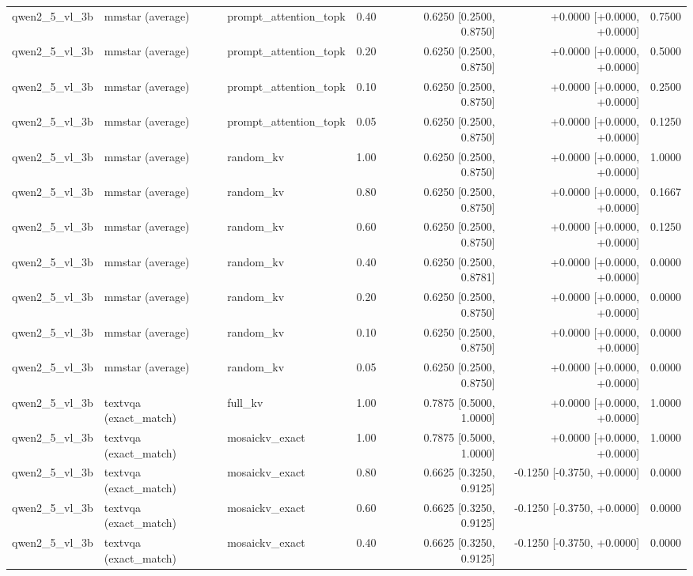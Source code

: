 \begin{longtable}{lllrrrr}
qwen2\_5\_vl\_3b & mmstar (average) & prompt\_attention\_topk & 0.40 & 0.6250 [0.2500, 0.8750] & +0.0000 [+0.0000, +0.0000] & 0.7500 \\
qwen2\_5\_vl\_3b & mmstar (average) & prompt\_attention\_topk & 0.20 & 0.6250 [0.2500, 0.8750] & +0.0000 [+0.0000, +0.0000] & 0.5000 \\
qwen2\_5\_vl\_3b & mmstar (average) & prompt\_attention\_topk & 0.10 & 0.6250 [0.2500, 0.8750] & +0.0000 [+0.0000, +0.0000] & 0.2500 \\
qwen2\_5\_vl\_3b & mmstar (average) & prompt\_attention\_topk & 0.05 & 0.6250 [0.2500, 0.8750] & +0.0000 [+0.0000, +0.0000] & 0.1250 \\
qwen2\_5\_vl\_3b & mmstar (average) & random\_kv & 1.00 & 0.6250 [0.2500, 0.8750] & +0.0000 [+0.0000, +0.0000] & 1.0000 \\
qwen2\_5\_vl\_3b & mmstar (average) & random\_kv & 0.80 & 0.6250 [0.2500, 0.8750] & +0.0000 [+0.0000, +0.0000] & 0.1667 \\
qwen2\_5\_vl\_3b & mmstar (average) & random\_kv & 0.60 & 0.6250 [0.2500, 0.8750] & +0.0000 [+0.0000, +0.0000] & 0.1250 \\
qwen2\_5\_vl\_3b & mmstar (average) & random\_kv & 0.40 & 0.6250 [0.2500, 0.8781] & +0.0000 [+0.0000, +0.0000] & 0.0000 \\
qwen2\_5\_vl\_3b & mmstar (average) & random\_kv & 0.20 & 0.6250 [0.2500, 0.8750] & +0.0000 [+0.0000, +0.0000] & 0.0000 \\
qwen2\_5\_vl\_3b & mmstar (average) & random\_kv & 0.10 & 0.6250 [0.2500, 0.8750] & +0.0000 [+0.0000, +0.0000] & 0.0000 \\
qwen2\_5\_vl\_3b & mmstar (average) & random\_kv & 0.05 & 0.6250 [0.2500, 0.8750] & +0.0000 [+0.0000, +0.0000] & 0.0000 \\
qwen2\_5\_vl\_3b & textvqa (exact\_match) & full\_kv & 1.00 & 0.7875 [0.5000, 1.0000] & +0.0000 [+0.0000, +0.0000] & 1.0000 \\
qwen2\_5\_vl\_3b & textvqa (exact\_match) & mosaickv\_exact & 1.00 & 0.7875 [0.5000, 1.0000] & +0.0000 [+0.0000, +0.0000] & 1.0000 \\
qwen2\_5\_vl\_3b & textvqa (exact\_match) & mosaickv\_exact & 0.80 & 0.6625 [0.3250, 0.9125] & -0.1250 [-0.3750, +0.0000] & 0.0000 \\
qwen2\_5\_vl\_3b & textvqa (exact\_match) & mosaickv\_exact & 0.60 & 0.6625 [0.3250, 0.9125] & -0.1250 [-0.3750, +0.0000] & 0.0000 \\
qwen2\_5\_vl\_3b & textvqa (exact\_match) & mosaickv\_exact & 0.40 & 0.6625 [0.3250, 0.9125] & -0.1250 [-0.3750, +0.0000] & 0.0000 \\

\end{longtable}
